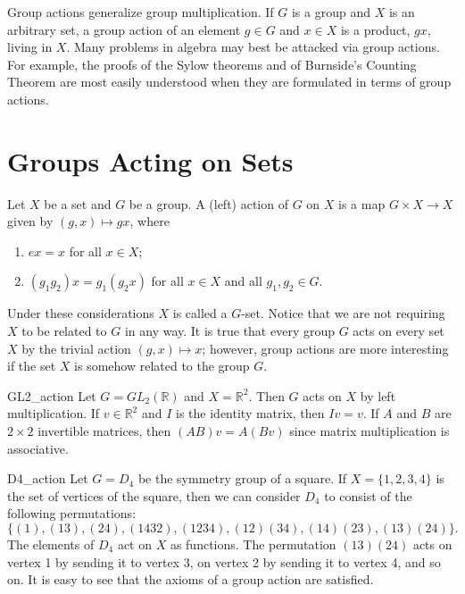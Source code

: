 
Group actions generalize group multiplication.  If $G$ is a group and $X$ is an arbitrary set, a group action of an element $g \in G$ and $x \in X$ is a product, $gx$,  living in $X$.  Many problems in algebra may best be attacked via group actions.  For example, the proofs of the Sylow theorems and of Burnside's Counting Theorem are most easily understood when they are formulated in terms of group actions. 


\section{Groups Acting on Sets}

Let $X$ be a set and $G$ be a group.  A  {\bfi (left) action\/} of $G$ on $X$ is a map $G \times X \rightarrow X$ given by $(g,x) \mapsto gx$, where 
\begin{enumerate}
 
\item 
$ex = x$ for all $x \in X$;
 
\item 
$(g_1 g_2)x = g_1(g_2 x)$ for all $x \in X$ and all $g_1, g_2 \in G$. 
 
\end{enumerate}
Under these considerations $X$ is called a {\bfi $G$-set}.  Notice that we are not requiring $X$ to be related to $G$ in any way.  It is true that every group $G$ acts on every set $X$ by the trivial action $(g,x) \mapsto x$; however, group actions are more interesting if the set $X$ is somehow related to the group $G$. 

\begin{example}{GL2_action}
Let $G = GL_2( {\mathbb R} )$ and $X = {\mathbb R}^2$. Then $G$ acts on $X$ by left multiplication.  If $v \in {\mathbb R}^2$ and $I$ is the identity matrix, then $Iv = v$.  If $A$ and $B$ are $2 \times 2$ invertible matrices, then $(AB)v = A(Bv)$ since matrix multiplication is
associative. 
\end{example}

\begin{example}{D4_action}
Let $G = D_4$ be the symmetry group of a square.  If $X = \{ 1, 2, 3, 4 \}$ is the set of vertices of the square, then we can consider $D_4$
to consist of the following permutations: 
\[
\{ (1), (13), (24), (1432), (1234), (12)(34), (14)(23), (13)(24) \}.
\]
The elements of $D_4$ act on $X$ as functions.  The permutation $(13)(24)$ acts on vertex 1 by sending it to vertex 3, on vertex 2 by
sending it to vertex 4, and so on.  It is easy to see that the  axioms of a group action are satisfied.
\mbox{\hspace{1in}}
\end{example}



